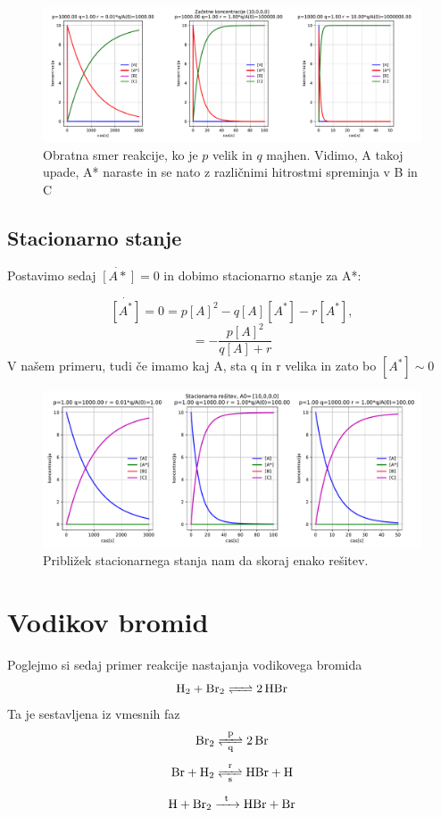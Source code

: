 \documentclass[11pt, a4paper]{article}
\begin{document}
\begin{figure}[H]
\hspace*{-1cm}     
  \includegraphics[width=20cm]{prva_obratna_reakcija.pdf}
  \caption{Obratna smer reakcije, ko je $p$ velik in $q$ majhen. Vidimo, A takoj upade, A* naraste in se nato z različnimi hitrostmi spreminja v B in C } 
\end{figure}
\subsection{Stacionarno stanje}
Postavimo sedaj  $\dot{[A*]} = 0$ in dobimo stacionarno stanje za A*:


\begin{equation}
\dot{[A^*]} =0= p[A]^2-q[A][A^*]-r[A^*],
\end{equation}
\begin{equation}
[A^*] = - \frac{p[A]^2}{q[A] + r} 
\end{equation}
V našem primeru, tudi če imamo kaj A, sta q in r velika in zato bo $[A^*] \sim 0$
\begin{figure}[htbp]
\hspace*{-1cm}     
  \includegraphics[width=20cm]{prva_stacionarna_resitev_skoraj_isto.pdf}
  \caption{Približek stacionarnega stanja nam da skoraj enako rešitev.} 
\end{figure}


\section{Vodikov bromid}
Poglejmo si sedaj primer reakcije nastajanja vodikovega bromida
\begin{equation}
 \ce{H_2 + Br_2 <=>2HBr}
\end{equation}
Ta je sestavljena iz vmesnih faz
\[
 \ce{Br_2 <=>[\ce{p}][\ce{q}] 2Br}
\]
\[
 \ce{Br + H_2 <=>[\ce{r}][\ce{s}]HBr + H}
\]
\[
 \ce{H + Br_2 ->[\ce{t}]HBr + Br}
\]
\end{document}
